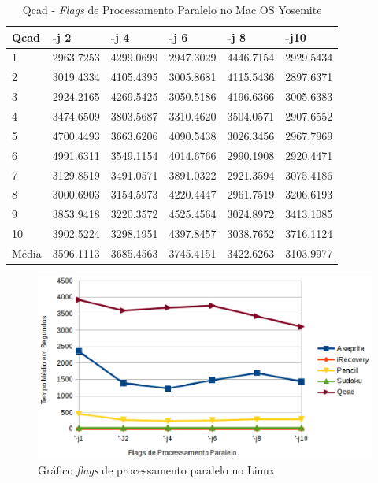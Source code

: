 \begin{apendicesenv}
\begin{table}[!ht]
\centering
\tiny
\caption{Qcad - \textit{Flags} de Processamento Paralelo no Mac OS Yosemite}
\label{tab:flag_processamento_paralelo:mac:qcad}
\begin{tabular}{llllll}
\textbf{Qcad} & \textbf{-j 2} & \textbf{-j 4} & \textbf{-j 6} & \textbf{-j 8} & \textbf{-j10}  \\ \toprule
1            & 2963.7253  &  4299.0699 &   2947.3029 &   4446.7154 &   2929.5434  \\ 
2            & 3019.4334  &  4105.4395 &   3005.8681 &   4115.5436 &   2897.6371  \\ 
3            & 2924.2165  &  4269.5425 &   3050.5186 &   4196.6366 &   3005.6383  \\ 
4            & 3474.6509  &  3803.5687 &   3310.4620 &   3504.0571 &   2907.6552  \\ 
5            & 4700.4493  &  3663.6206 &   4090.5438 &   3026.3456 &   2967.7969  \\ 
6            & 4991.6311  &  3549.1154 &   4014.6766 &   2990.1908 &   2920.4471  \\ 
7            & 3129.8519  &  3491.0571 &   3891.0322 &   2921.3594 &   3075.4186  \\ 
8            & 3000.6903  &  3154.5973 &   4220.4447 &   2961.7519 &   3206.6193  \\ 
9            & 3853.9418  &  3220.3572 &   4525.4564 &   3024.8972 &   3413.1085  \\ 
10           & 3902.5224  &  3298.1951 &   4397.8457 &   3038.7652 &   3716.1124  \\ \bottomrule
Média        & 3596.1113  &  3685.4563 &   3745.4151 &   3422.6263 &   3103.9977  \\ 
\end{tabular}
\end{table}

        \begin{figure}[!h]
            \centering
                \includegraphics{figuras/graficos/linux_processamento_paralelo.eps}
            \caption{Gráfico \textit{flags} de processamento paralelo no Linux}
            \label{flags_de_processamento_paralelo_linux}
        \end{figure}


\end{apendicesenv}
